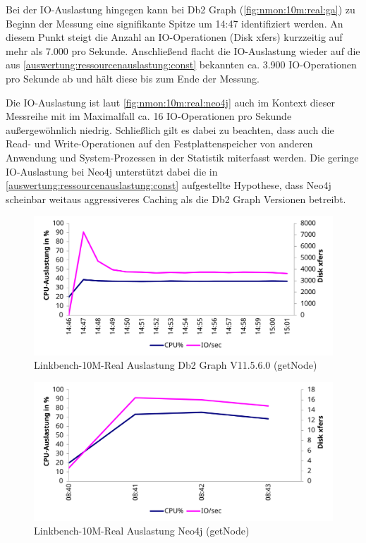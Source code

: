 Bei der IO-Auslastung hingegen kann bei Db2 Graph (\autoref{fig:nmon:10m:real:ga}) zu Beginn der Messung eine signifikante Spitze um 14:47 identifiziert werden. An diesem Punkt steigt die Anzahl an IO-Operationen (Disk xfers) kurzzeitig auf mehr als 7.000 pro Sekunde. Anschließend flacht die IO-Auslastung wieder auf die aus \autoref{auswertung:ressourcenauslastung:const} bekannten ca. 3.900 IO-Operationen pro Sekunde ab und hält diese bis zum Ende der Messung.

Die IO-Auslastung ist laut \autoref{fig:nmon:10m:real:neo4j} auch im Kontext dieser Messreihe mit im Maximalfall ca. 16 IO-Operationen pro Sekunde außergewöhnlich niedrig. Schließlich gilt es dabei zu beachten, dass auch die Read- und Write-Operationen auf den Festplattenspeicher von anderen Anwendung und System-Prozessen in der Statistik miterfasst werden. Die geringe IO-Auslastung bei Neo4j unterstützt dabei die in \autoref{auswertung:ressourcenauslastung:const} aufgestellte Hypothese, dass Neo4j scheinbar weitaus aggressiveres Caching als die Db2 Graph Versionen betreibt. 
\begin{figure}[!ht]
    \centering
    \includegraphics[width=\textwidth]{images/stats/linkbench-10m-real_ga.pdf}
    \caption{Linkbench-10M-Real Auslastung Db2 Graph V11.5.6.0 (getNode)}
    \label{fig:nmon:10m:real:ga}
\end{figure}

\begin{figure}[!ht]
    \centering
    \includegraphics[width=\textwidth]{images/stats/linkbench-10m-real_neo4j.pdf}
    \caption{Linkbench-10M-Real Auslastung Neo4j (getNode)}
    \label{fig:nmon:10m:real:neo4j}
\end{figure}

